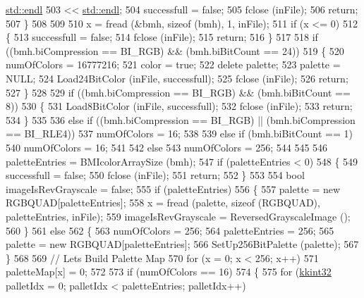 \begin{DoxyCode}
      \hyperlink{namespace_k_k_b_ad1f50f65af6adc8fa9e6f62d007818a8}{std::endl}
503          << \hyperlink{namespace_k_k_b_ad1f50f65af6adc8fa9e6f62d007818a8}{std::endl};
504     successfull = \textcolor{keyword}{false};
505     fclose (inFile);
506     \textcolor{keywordflow}{return};
507   \}
508 
509 
510   x = fread (&bmh, \textcolor{keyword}{sizeof} (bmh), 1, inFile);
511   \textcolor{keywordflow}{if}  (x <= 0)
512   \{
513     successfull = \textcolor{keyword}{false};
514     fclose (inFile);
515     \textcolor{keywordflow}{return};
516   \}
517 
518   \textcolor{keywordflow}{if}  ((bmh.biCompression == BI\_RGB)  &&  (bmh.biBitCount == 24))
519   \{
520     numOfColors = 16777216;
521     color = \textcolor{keyword}{true};
522     \textcolor{keyword}{delete}  palette;
523     palette = NULL;
524     Load24BitColor (inFile, successfull);
525     fclose (inFile);
526     \textcolor{keywordflow}{return};
527   \}
528 
529   \textcolor{keywordflow}{if}  ((bmh.biCompression == BI\_RGB)  &&  (bmh.biBitCount == 8))
530   \{
531     Load8BitColor (inFile, successfull);
532     fclose (inFile);
533     \textcolor{keywordflow}{return};
534   \}
535 
536   \textcolor{keywordflow}{else} \textcolor{keywordflow}{if}  ((bmh.biCompression == BI\_RGB)  ||  (bmh.biCompression == BI\_RLE4))
537     numOfColors = 16;
538 
539   \textcolor{keywordflow}{else}  \textcolor{keywordflow}{if}  (bmh.biBitCount == 1)
540     numOfColors = 16;
541 
542   \textcolor{keywordflow}{else}
543     numOfColors = 256;
544 
545 
546   paletteEntries = BMIcolorArraySize (bmh);
547   \textcolor{keywordflow}{if}  (paletteEntries < 0)
548   \{
549     successfull = \textcolor{keyword}{false};
550     fclose (inFile);
551     \textcolor{keywordflow}{return};
552   \}
553 
554   \textcolor{keywordtype}{bool}  imageIsRevGrayscale = \textcolor{keyword}{false};
555   \textcolor{keywordflow}{if}  (paletteEntries)
556   \{
557     palette =  \textcolor{keyword}{new} RGBQUAD[paletteEntries];
558     x = fread (palette, \textcolor{keyword}{sizeof} (RGBQUAD), paletteEntries, inFile);
559     imageIsRevGrayscale = ReversedGrayscaleImage ();
560   \}
561   \textcolor{keywordflow}{else}
562   \{
563     numOfColors   = 256;
564     paletteEntries = 256;
565     palette = \textcolor{keyword}{new} RGBQUAD[paletteEntries];
566     SetUp256BitPalette (palette);
567   \}
568 
569   \textcolor{comment}{// Lets Build Palette Map}
570   \textcolor{keywordflow}{for}  (x = 0; x < 256; x++)
571     paletteMap[x] = 0;
572 
573   \textcolor{keywordflow}{if}  (numOfColors == 16)
574   \{
575     \textcolor{keywordflow}{for}  (\hyperlink{namespace_k_k_b_a8fa4952cc84fda1de4bec1fbdd8d5b1b}{kkint32} palletIdx = 0; palletIdx < paletteEntries; palletIdx++)

\end{DoxyCode}
